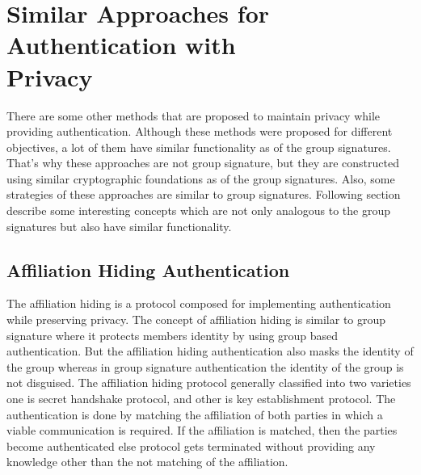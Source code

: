 \section[Similar Approaches for Authentication with Privacy]{Similar Approaches for Authentication with \\Privacy}
There are some other methods that are proposed to maintain privacy while providing authentication. Although these methods were proposed for different objectives, a lot of them have similar functionality as of the group signatures. That's why these approaches are not group signature, but they are constructed using similar cryptographic foundations as of the group signatures. Also, some strategies of these approaches are similar to group signatures. Following section describe some interesting concepts which are not only analogous to the group signatures but also have similar functionality.

\subsection{Affiliation Hiding Authentication}
The affiliation hiding is a protocol composed for implementing authentication while preserving privacy. The concept of affiliation hiding is similar to group signature where it protects members identity by using group based authentication. But the affiliation hiding authentication also masks the identity of the group whereas in group signature authentication the identity of the group is not disguised. The affiliation hiding protocol generally classified into two varieties one is secret handshake protocol, and other is key establishment protocol. The authentication is done by matching the affiliation of both parties in which a viable communication is required. If the affiliation is matched, then the parties become authenticated else protocol gets terminated without providing any knowledge other than the not matching of the affiliation. 

